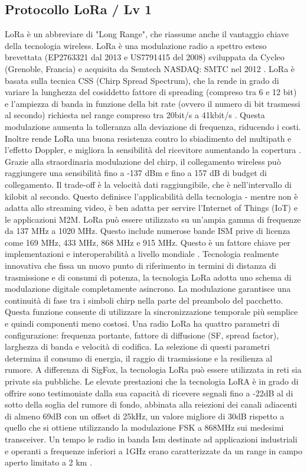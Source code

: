 \documentclass[a4paper]{report} %
\begin{document}
\subsection{Protocollo LoRa / Lv 1}
LoRa è un abbreviare di "Long Range", che riassume anche il vantaggio chiave della tecnologia wireless. LoRa è una modulazione radio a spettro esteso brevettata (EP2763321 dal 2013 e US7791415 del 2008) sviluppata da Cycleo (Grenoble, Francia) e acquisita da Semtech NASDAQ: SMTC nel 2012 \cite{art:rif.30}. 
LoRa è basata sulla tecnica CSS (Chirp Spread Spectrum), che la rende in grado di variare la lunghezza del cosiddetto fattore di spreading (compreso tra 6 e 12 bit) e l'ampiezza di banda in funzione della bit rate (ovvero il numero di bit trasmessi al secondo) richiesta nel range compreso tra 20bit/s a 41kbit/s \cite{art:rif.23}. 
Questa modulazione aumenta la tolleranza alla deviazione di frequenza, riducendo i costi. Inoltre rende LoRa una buona resistenza contro lo sbiadimento del multipath e l'effetto Doppler, e migliora la sensibilità del ricevitore aumentando la copertura \cite{art:rif.44}. 
Grazie alla straordinaria modulazione del chirp, il collegamento wireless può raggiungere una sensibilità fino a -137 dBm e fino a 157 dB di budget di collegamento. Il trade-off è la velocità dati raggiungibile, che è nell'intervallo di kilobit al secondo. Questo definisce l'applicabilità della tecnologia - mentre non è adatta allo streaming video, è ben adatta per servire l'Internet of Things (IoT) e le applicazioni M2M. LoRa può essere utilizzato su un'ampia gamma di frequenze da 137 MHz a 1020 MHz. Questo include numerose bande ISM prive di licenza come 169 MHz, 433 MHz, 868 MHz e 915 MHz. Questo è un fattore chiave per implementazioni e interoperabilità a livello mondiale \cite{art:rif.30}. 
Tecnologia realmente innovativa che fissa un nuovo punto di riferimento in termini di distanza di trasmissione e di consumi di potenza, la tecnologia LoRa adotta uno schema di modulazione digitale completamente asincrono. La modulazione garantisce una continuità di fase tra i simboli chirp nella parte del preambolo del pacchetto. Questa funzione consente di utilizzare la sincronizzazione temporale più semplice e quindi componenti meno costosi. Una radio LoRa ha quattro parametri di configurazione: frequenza portante, fattore di diffusione (SF, spread factor), larghezza di banda e velocità di codifica. La selezione di questi parametri determina il consumo di energia, il raggio di trasmissione e la resilienza al rumore. A differenza di SigFox, la tecnologia LoRa può essere utilizzata in reti sia private sia pubbliche. Le elevate prestazioni che la tecnologia LoRA è in grado di offrire sono testimoniate dalla sua capacità di ricevere segnali fino a -22dB al di sotto della soglia del rumore di fondo, abbinata alla reiezioni dei canali adiacenti di almeno 69dB con un offset di 25kHz, un valore migliore di 30dB rispetto a quello che si ottiene utilizzando la modulazione FSK a 868MHz sui medesimi transceiver. Un tempo le radio in banda Ism destinate ad applicazioni industriali e operanti a frequenze inferiori a 1GHz erano caratterizzate da un range in campo aperto limitato a 2 km \cite{art:rif.23}. 
\end{document}
